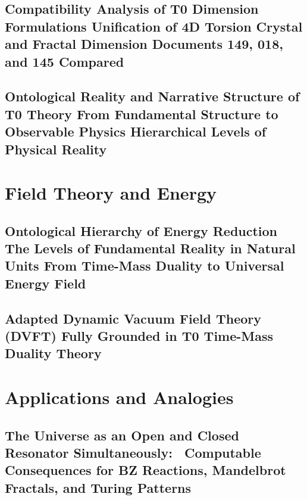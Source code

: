 \documentclass[11pt,openright,twoside]{book}
\begin{document}
\chapter{Compatibility Analysis of T0 Dimension Formulations Unification of 4D Torsion Crystal and Fractal Dimension Documents 149, 018, and 145 Compared}


\chapter{Ontological Reality and Narrative Structure of T0 Theory From Fundamental Structure to Observable Physics Hierarchical Levels of Physical Reality}


\part{Field Theory and Energy}

\chapter{Ontological Hierarchy of Energy Reduction The Levels of Fundamental Reality in Natural Units From Time-Mass Duality to Universal Energy Field}


\chapter{Adapted Dynamic Vacuum Field Theory (DVFT) Fully Grounded in T0 Time-Mass Duality Theory}


\part{Applications and Analogies}

\chapter{The Universe as an Open and Closed Resonator Simultaneously: \ Computable Consequences for BZ Reactions, Mandelbrot Fractals, and Turing Patterns}

\end{document}
